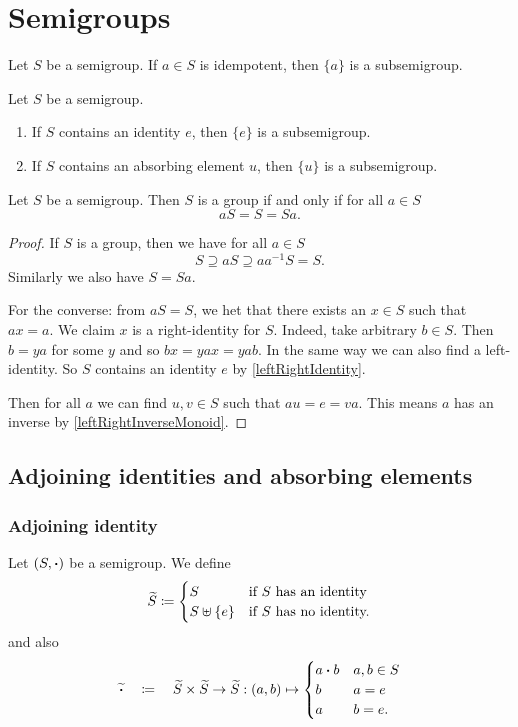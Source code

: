 \section{Semigroups}
\begin{lemma}
Let $S$ be a semigroup. If $a\in S$ is idempotent, then $\{a\}$ is a subsemigroup.
\end{lemma}
\begin{corollary}
Let $S$ be a semigroup.
\begin{enumerate}
\item If $S$ contains an identity $e$, then $\{e\}$ is a subsemigroup.
\item If $S$ contains an absorbing element $u$, then $\{u\}$ is a subsemigroup.
\end{enumerate}
\end{corollary}

\begin{proposition} \label{groupCriterion}
Let $S$ be a semigroup. Then $S$ is a group \textup{if and only if} for all $a\in S$
\[ aS = S = Sa. \]
\end{proposition}
\begin{proof}
If $S$ is a group, then we have for all $a\in S$
\[ S \supseteq aS \supseteq aa^{-1}S = S. \]
Similarly we also have $S = Sa$.

For the converse: from $aS = S$, we het that there exists an $x\in S$ such that $ax = a$. We claim $x$ is a right-identity for $S$. Indeed, take arbitrary $b\in S$. Then $b = ya$ for some $y$ and so $bx = yax = ya b$. In the same way we can also find a left-identity. So $S$ contains an identity $e$ by \ref{leftRightIdentity}.

Then for all $a$ we can find $u,v\in S$ such that $au = e = va$. This means $a$ has an inverse by \ref{leftRightInverseMonoid}.
\end{proof}

\subsection{Adjoining identities and absorbing elements}
\subsubsection{Adjoining identity}
\begin{definition}
Let $\left( S,\boldsymbol{\cdot} \right)$ be a semigroup. We define
\[ \widetilde{S} \coloneqq \begin{cases}
S & \text{if $S$ has an identity} \\
S\uplus \{e\} & \text{if $S$ has no identity.}
\end{cases} \]
and also
\[ \widetilde{\boldsymbol{\cdot}} \quad\coloneqq\quad \widetilde{S}\times \widetilde{S}\to \widetilde{S}: (a,b) \mapsto \begin{cases}
a\boldsymbol{\cdot} b & a,b\in S \\
b & a = e \\
a & b = e.
\end{cases} \]
\end{definition}


